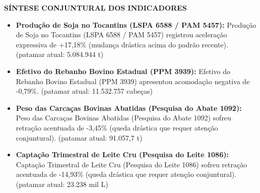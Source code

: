 \documentclass[10pt,a4paper]{article}
\begin{document}
{\hfill%
%
}

\vspace{0.08cm}
\par\vspace{0.05cm}
\par\vspace{4pt}
{\fontsize{7.8}{9.4}\selectfont\bfseries\color{corprimaria}\MakeUppercase{Síntese Conjuntural dos Indicadores}}\par\vspace{2pt}
{\scriptsize\color{cinzatexto}
\begin{itemize}[leftmargin=10pt, itemsep=1.2pt, topsep=1pt, parsep=0pt]
   \item \textbf{\color{corprimaria}Produção de Soja no Tocantins (LSPA 6588 / PAM 5457):} Produção de Soja no Tocantins (LSPA 6588 / PAM 5457) registrou aceleração expressiva de +17,18\% (mudança drástica acima do padrão recente). (patamar atual: 5.084.944 t)
   \item \textbf{\color{corprimaria}Efetivo do Rebanho Bovino Estadual (PPM 3939):} Efetivo do Rebanho Bovino Estadual (PPM 3939) apresentou acomodação negativa de -0,79\%. (patamar atual: 11.532.757 cabeças)
   \item \textbf{\color{corprimaria}Peso das Carcaças Bovinas Abatidas (Pesquisa do Abate 1092):} Peso das Carcaças Bovinas Abatidas (Pesquisa do Abate 1092) sofreu retração acentuada de -3,45\% (queda drástica que requer atenção conjuntural). (patamar atual: 91.057,7 t)
   \item \textbf{\color{corprimaria}Captação Trimestral de Leite Cru (Pesquisa do Leite 1086):} Captação Trimestral de Leite Cru (Pesquisa do Leite 1086) sofreu retração acentuada de -14,93\% (queda drástica que requer atenção conjuntural). (patamar atual: 23.238 mil L)
\end{itemize}
}
\par\vspace{0.05cm}
\end{document}
